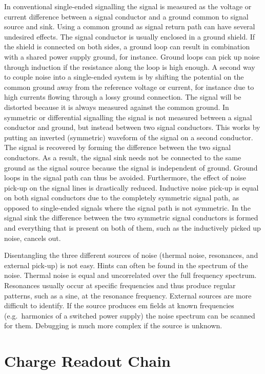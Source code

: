 In conventional single-ended signalling the signal is measured as the voltage or current difference between a signal conductor and a ground common to signal source and sink.
Using a common ground as signal return path can have several undesired effects.
The signal conductor is usually enclosed in a ground shield.
If the shield is connected on both sides, a ground loop can result in combination with a shared power supply ground, for instance.
Ground loops can pick up noise through induction if the resistance along the loop is high enough.
A second way to couple noise into a single-ended system is by shifting the potential on the common ground away from the reference voltage or current, for instance due to high currents flowing through a lossy ground connection.
The signal will be distorted because it is always measured against the common ground.
In symmetric or differential signalling the signal is not measured between a signal conductor and ground, but instead between two signal conductors.
This works by putting an inverted (symmetric) waveform of the signal on a second conductor.
The signal is recovered by forming the difference between the two signal conductors.
As a result, the signal sink needs not be connected to the same ground as the signal source because the signal is independent of ground.
Ground loops in the signal path can thus be avoided.
Furthermore, the effect of noise pick-up on the signal lines is drastically reduced.
Inductive noise pick-up is equal on both signal conductors due to the completely symmetric signal path, as opposed to single-ended signals where the signal path is not symmetric.
In the signal sink the difference between the two symmetric signal conductors is formed and everything that is present on both of them, such as the inductively picked up noise, cancels out.

Disentangling the three different sources of noise (thermal noise, resonances, and external pick-up) is not easy.
Hints can often be found in the spectrum of the noise.
Thermal noise is equal and uncorrelated over the full frequency spectrum.
Resonances usually occur at specific frequencies and thus produce regular patterns, such as a sine, at the resonance frequency.
External sources are more difficult to identify.
If the source produces \gls{em} fields at known frequencies (e.g.\ harmonics of a switched power supply) the noise spectrum can be scanned for them.
Debugging is much more complex if the source is unknown.


\section{\AT{} Charge Readout Chain}
\label{sec:studies_at-ro}

